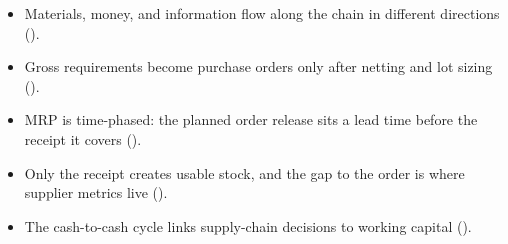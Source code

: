 \begin{chapterrecap}
\begin{itemize}
  \item Materials, money, and information flow along the chain in different directions ().
  \item Gross requirements become purchase orders only after netting and lot sizing ().
  \item MRP is time-phased: the planned order release sits a lead time before the receipt it covers ().
  \item Only the receipt creates usable stock, and the gap to the order is where supplier metrics live ().
  \item The cash-to-cash cycle links supply-chain decisions to working capital ().
\end{itemize}
\end{chapterrecap}
